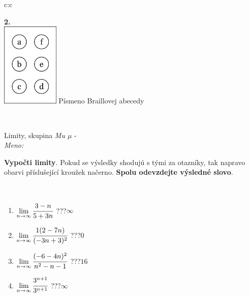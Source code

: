 \documentclass[10pt]{report}
\begin{document}
\begin{tabular}{c:c}
\begin{minipage}[c][104.5mm][t]{0.5\linewidth}
\begin{center}
\begin{minipage}{0.20\linewidth}
\begin{center}
{\Huge\bfseries 2.} \\[2mm]
\includegraphics[height=40mm]{../images/braille.png}
{\small Písmeno Braillovej abecedy}
\end{center}
\end{minipage}
\end{center}
\end{minipage}
\\ \hdashline
\begin{minipage}[c][104.5mm][t]{0.5\linewidth}
\begin{center}
\vspace{7mm}
{\huge Limity, skupina \textit{Mu $\mu$} -}\\[5mm]
\textit{Meno:}\phantom{xxxxxxxxxxxxxxxxxxxxxxxxxxxxxxxxxxxxxxxxxxxxxxxxxxxxxxxxxxxxxxxxx}\\[5mm]
\begin{minipage}{0.95\linewidth}
\begin{center}
\textbf{Vypočti limity}. Pokud se výsledky shodujú s tými za otazníky, tak napravo\\obarvi příslušející kroužek načerno. \textbf{Spolu odevzdejte výsledné slovo}.
\end{center}
\end{minipage}
\\[1mm]
\begin{minipage}{0.79\linewidth}
\begin{center}
\begin{varwidth}{\linewidth}
\begin{enumerate}
\normalsize
\item $\lim\limits_{n\to\infty}\cfrac{3-n}{5+3n}$\quad \dotfill\; ???\;\dotfill \quad $\infty$
\item $\lim\limits_{n\to\infty}\cfrac{1(2-7n)}{(-3n+3)^2}$\quad \dotfill\; ???\;\dotfill \quad $0$
\item $\lim\limits_{n\to\infty}\cfrac{(-6-4n)^2}{n^2-n-1}$\quad \dotfill\; ???\;\dotfill \quad $16$
\item $\lim\limits_{n\to\infty}\cfrac{3^{n+1}}{3^{n+1}}$\quad \dotfill\; ???\;\dotfill \quad $\infty$

\end{enumerate}
\end{varwidth}
\end{center}
\end{minipage}
\end{center}
\end{minipage}
\end{tabular}
\end{document}
